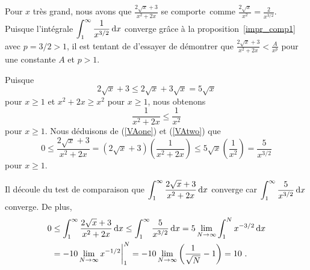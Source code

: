 { Pour $x$ très grand, nous avons que
$\displaystyle \frac{2\sqrt{x}+3}{x^2+2x}$ se \lgm comporte\rgm\ comme
$\displaystyle \frac{2\sqrt{x}}{x^2} = \frac{2}{x^{3/2}}$.
Puisque l'intégrale 
$\displaystyle \int_1^{\infty} \frac{1}{x^{3/2}}\,\mathrm{d}x$ converge grâce
à la proposition~\ref{impr_comp1} avec $p = 3/2 >1$, il est tentant de
d'essayer de démontrer que
$\displaystyle \frac{2\sqrt{x}+3}{x^2+2x} < \frac{A}{x^p}$ pour une
constante $A$ et $p > 1$.

Puisque
\begin{equation}\label{VAone}
2\sqrt{x} + 3 \leq 2\sqrt{x} + 3\sqrt{x} = 5\sqrt{x}
\end{equation}
pour $x\geq 1$ et $x^2+2x \geq x^2$ pour $x\geq 1$, nous obtenons
\begin{equation}\label{VAtwo}
\frac{1}{x^2+2x} \leq \frac{1}{x^2}
\end{equation}
pour $x\geq 1$.  Nous déduisons de (\ref{VAone}) et (\ref{VAtwo}) que
\[
0 \leq \frac{2\sqrt{x}+3}{x^2+2x}
= (2\sqrt{x}+3) \left(\frac{1}{x^2+2x}\right)
\leq 5\sqrt{x} \left( \frac{1}{x^2}\right) = \frac{5}{x^{3/2}}
\]
pour $x\geq 1$.

Il découle du test de comparaison que
$\displaystyle \int_1^\infty \frac{2\sqrt{x}+3}{x^2+2x} \,\mathrm{d}x$
converge car $\displaystyle \int_1^\infty \frac{5}{x^{3/2}}\,\mathrm{d}x$
converge.  De plus,
\begin{align*}
0 &\leq \int_1^\infty \frac{2\sqrt{x}+3}{x^2+2x} \,\mathrm{d}x
\leq \int_1^\infty \frac{5}{x^{3/2}}\,\mathrm{d}x
= 5 \lim_{N\to \infty} \int_1^N x^{-3/2} \,\mathrm{d}x\\
&= -10 \lim_{N\to \infty} x^{-1/2}\bigg|_1^N
= -10 \lim_{N\to \infty} \left( \frac{1}{\sqrt{N}} - 1 \right)
= 10 \ .
\end{align*}
}


